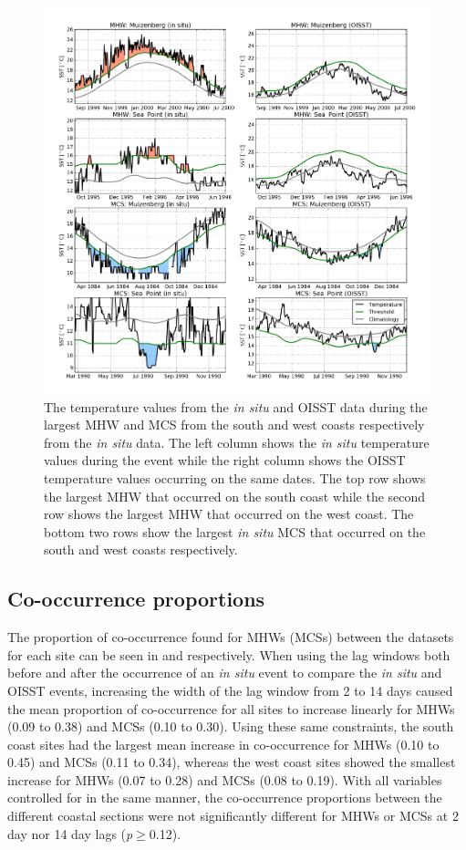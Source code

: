 \documentclass[a4paper,10pt,review]{elsarticle}
\begin{document}
\begin{figure}
\centering
\includegraphics[width=1.0\textwidth]{figure3.png}
\caption{The temperature values from the \emph{in situ} and OISST data during the largest MHW and MCS from the south and west coasts respectively from the \emph{in situ} data. The left column shows the \emph{in situ} temperature values during the event while the right column shows the OISST temperature values occurring on the same dates. The top row shows the largest MHW that occurred on the south coast while the second row shows the largest MHW that occurred on the west coast. The bottom two rows show the largest \emph{in situ} MCS that occurred on the south and west coasts respectively.}
\label{fig:Figure3}
\end{figure}

\subsection{Co-occurrence proportions}
The proportion of co-occurrence found for MHWs (MCSs) between the datasets for each site can be seen in  and  respectively. When using the lag windows both before and after the occurrence of an \emph{in situ} event to compare the \emph{in situ} and OISST events, increasing the width of the lag window from 2 to 14 days caused the mean proportion of co-occurrence for all sites to increase linearly for MHWs (0.09 to 0.38) and MCSs (0.10 to 0.30). Using these same constraints, the south coast sites had the largest mean increase in co-occurrence for MHWs (0.10 to 0.45) and MCSs (0.11 to 0.34), whereas the west coast sites showed the smallest increase for MHWs (0.07 to 0.28) and MCSs (0.08 to 0.19). With all variables controlled for in the same manner, the co-occurrence proportions between the different coastal sections were not significantly different for MHWs or MCSs at 2 day nor 14 day lags (\emph{p}$\geq$0.12).
\end{document}
